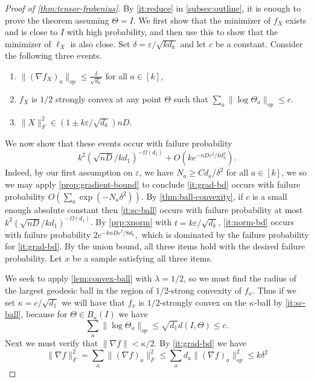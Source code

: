 \documentclass[aos]{imsart}
\theoremstyle{definition}
\newcommand{\eps}{\varepsilon}
\newcommand{\samp}{x}
\newcommand{\rv}{X}
\newcommand{\CF}[1]{{\color{purple}[CF: #1]}}
\begin{document}
\begin{proof}[Proof of \cref{thm:tensor-frobenius}]By \cref{it:reduce} in \cref{subsec:outline}, it is enough to prove the theorem assuming $\Theta = I$. We first show that the minimizer of $f_\rv$ exists and is close to $I$ with high probability, and then use this to show that the minimizer of $\ell_\rv$ is also close.  Set $\delta = \eps/\sqrt{k d_k}$ and let $c$ be a constant. Consider the following three events.
\begin{enumerate}
\item\label{it:grad-bd} $\|(\nabla f_\rv)_{a}\|_{op} \leq \frac{\delta}{\sqrt{d_{a}}}$ for all $a \in [k]$,
\item\label{it:sc-ball} $f_\rv$ is $1/2$ strongly convex at any point $\Theta$ such that $\sum_a \|\log \Theta_a\|_{op} \leq  c.$
\item\label{it:norm-bd} $\| \rv\|_F^2 \in (1 \pm k \eps/\sqrt{d_k}) nD.$
\end{enumerate}
We now show that these events occur with failure probability $$k^2 \left(\sqrt{nD} / kd_1 \right)^{ - \Omega(d_1)} + O(k e^{ - nD \eps^2 / k d_k^2}).$$ Indeed, by our first assumption on $\eps$, we have $N_a \geq C d_a/\delta^2$ for all $a \in [k]$, we so we may apply \cref{prop:gradient-bound} to conclude \cref{it:grad-bd} occurs with failure probability $O\left( \sum_a \exp ( - N_a \delta^2)\right)$.
By \cref{thm:ball-convexity}, if $c$ is a small enough absolute constant then \cref{it:sc-ball} occurs with failure probability at most $k^2 \left(\sqrt{nD} / kd_1 \right)^{ - \Omega(d_1)}$. By \cref{prp:xnorm} with $t = k \eps/\sqrt{d_k}$, \cref{it:norm-bd} occurs with failure probability $2e^{- k nD \eps^2/8 d_k},$ which is dominated by the failure probability for \cref{it:grad-bd}. By the union bound, all three items hold with the desired failure probability. Let $\samp$ be a sample satisfying all three items.


We seek to apply \cref{lem:convex-ball} with $\lambda = 1/2$, so we must find the radius of the largest geodesic ball in the region of $1/2$-strong convexity of $f_\samp$. Thus if we set $\kappa = c/\sqrt{d_1}$ we will have that $f_\samp$ is $1/2$-strongly convex on the $\kappa$-ball by \cref{it:sc-ball}, because for $\Theta \in B_\kappa(I)$ we have
$$ \sum_a \|\log \Theta_a\|_{op} \leq \sqrt{d_1} d(I, \Theta) \leq c.$$
Next we must verify that $\|\nabla f\| < \kappa/2$. By \cref{it:grad-bd} we have
\[  \|\nabla f\|_F^{2} = \sum_{a} \|(\nabla f)_{a}\|_{F}^{2} \leq \sum_{a} d_a \|(\nabla f)_{a}\|_{op}^{2} \leq  k \delta^{2} \]


\end{proof}
\end{document}
